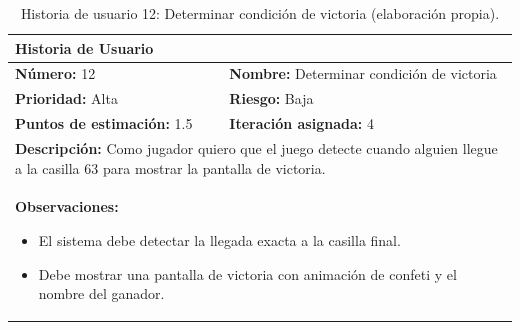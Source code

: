\begin{table}[H]
\centering
\caption{Historia de usuario 12: Determinar condición de victoria (elaboración propia).\label{tab:hu12}}
\renewcommand{\arraystretch}{1.5}
\begin{tabular}{|p{}|p{}|}
\hline
\multicolumn{2}{|l|}{\textbf{Historia de Usuario}} \\
\hline
\textbf{Número:} 12 & \textbf{Nombre:} Determinar condición de victoria \\
\hline
\textbf{Prioridad:} Alta & \textbf{Riesgo:} Baja \\
\hline
\textbf{Puntos de estimación:} 1.5 & \textbf{Iteración asignada:} 4 \\
\hline
\multicolumn{2}{|p{0.945\textwidth}|}{\textbf{Descripción:} Como jugador quiero que el juego detecte cuando alguien llegue a la casilla 63 para mostrar la pantalla de victoria.} \\
\hline
\multicolumn{2}{|p{0.945\textwidth}|}{\textbf{Observaciones:}
\vspace{-0.5em}
\begin{itemize}
    \setlength\itemsep{0em}
    \item El sistema debe detectar la llegada exacta a la casilla final.
    \item Debe mostrar una pantalla de victoria con animación de confeti y el nombre del ganador.
\end{itemize}
\vspace{-1em}
} \\
\hline
\end{tabular}
\end{table}

